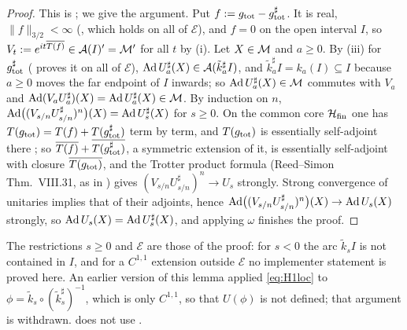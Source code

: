 \begin{proof}
This is \cite[Thm.~4.7, step $\langle1\rangle7$]{RigorC}; we give the argument.  Put
$f:=g_{\rm tot}-g^{\sharp}_{\rm tot}$.  It is real, $\|f\|_{3/2}<\infty$ (\cite[Thm.~2.3(c)]{RigorC}, which holds on
all of $\mathcal E$), and $f=0$ on the open interval $I$, so $V_{t}:=e^{it\overline{T(f)}}\in\mathcal A(I)'=\mathcal M'$ for all
$t$ by (i).  Let $X\in\mathcal M$ and $a\ge0$.  By (iii) for $g^{\sharp}_{\rm tot}$ (\cite[Thm.~4.7]{RigorC} proves it on all of $\mathcal E$),
$\operatorname{Ad} U^{\sharp}_{a}(X)\in\mathcal A(\tilde k^{\sharp}_{a}I)$, and $\tilde k^{\sharp}_{a}I=k_{a}(I)\subseteq I$ because
$a\ge0$ moves the far endpoint of $I$ inwards; so $\operatorname{Ad} U^{\sharp}_{a}(X)\in\mathcal M$ commutes with $V_{a}$ and
$\operatorname{Ad}(V_{a}U^{\sharp}_{a})(X)=\operatorname{Ad} U^{\sharp}_{a}(X)\in\mathcal M$.  By induction on $n$,
$\operatorname{Ad}\bigl((V_{s/n}U^{\sharp}_{s/n})^{n}\bigr)(X)=\operatorname{Ad} U^{\sharp}_{s}(X)$ for $s\ge0$.  On the common core
$\mathcal H_{\rm fin}$ one has $T(g_{\rm tot})=T(f)+T(g^{\sharp}_{\rm tot})$ term by term, and $T(g_{\rm tot})$ is
essentially self-adjoint there \cite[Thm.~4.4]{CW}; so $\overline{T(f)}+\overline{T(g^{\sharp}_{\rm tot})}$, a
symmetric extension of it, is essentially self-adjoint with closure $\overline{T(g_{\rm tot})}$, and the
Trotter product formula (Reed--Simon Thm.~VIII.31, as in ) gives
$(V_{s/n}U^{\sharp}_{s/n})^{n}\to U_{s}$ strongly.  Strong convergence of unitaries implies that of their
adjoints, hence $\operatorname{Ad}\bigl((V_{s/n}U^{\sharp}_{s/n})^{n}\bigr)(X)\to\operatorname{Ad} U_{s}(X)$ strongly, so
$\operatorname{Ad} U_{s}(X)=\operatorname{Ad} U^{\sharp}_{s}(X)$, and applying $\omega$ finishes the proof.
\end{proof}

The restrictions $s\ge0$ and $\mathcal E$ are those of the proof: for $s<0$ the arc $\tilde k_{s}I$ is not
contained in $I$, and for a $C^{1,1}$ extension outside $\mathcal E$ no implementer statement is proved here.
An earlier version of this lemma applied \eqref{eq:H1loc} to $\phi=\tilde k_{s}\circ(\tilde k_{s}^{\sharp})^{-1}$,
which is only $C^{1,1}$, so that $U(\phi)$ is not defined; that argument is withdrawn.   does not
use .
